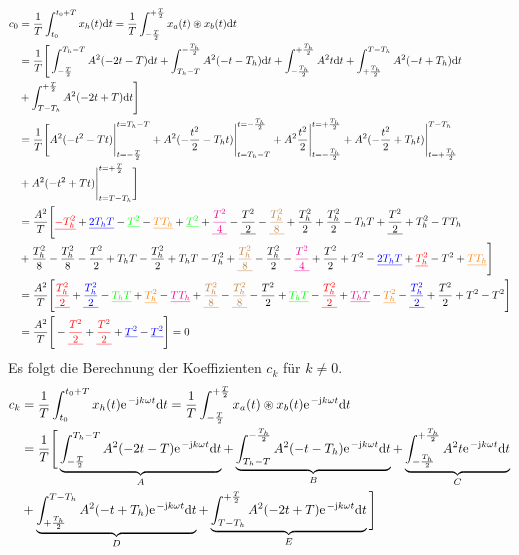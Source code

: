 \documentclass[11pt,a4paper,DIV=12]{scrartcl}
\newcommand{\ured}[1]{\textcolor{red}{\underline{#1}}}
\newcommand{\ublue}[1]{\textcolor{blue}{\underline{#1}}}
\newcommand{\ugreen}[1]{\textcolor{green}{\underline{#1}}}
\newcommand{\uorange}[1]{\textcolor{orange}{\underline{#1}}}
\newcommand{\umagenta}[1]{\textcolor{magenta}{\underline{#1}}}
\newcommand{\ublack}[1]{\textcolor{black}{\underline{#1}}}
\newcommand{\ubrown}[1]{\textcolor{brown}{\underline{#1}}}
\newcommand{\diff}{\mathrm{d}}
\begin{document}
\begin{align}
	c_0&=\frac{1}{T}\int_{t_0}^{t_0+T}x_{h}(t)\diff t=\frac{1}{T}\int_{-\frac{T}{2}}^{+\frac{T}{2}}x_{a}(t)\circledast x_{b}(t)\diff t \nonumber \\
	&=\frac{1}{T}\Bigg [\int_{-\frac{T}{2}}^{T_h-T}A^2(-2t-T)\diff t+\int_{T_h-T}^{-\frac{T_h}{2}}A^2(-t-T_h)\diff t+\int_{-\frac{T_h}{2}}^{+\frac{T_h}{2}}A^2t\diff t+\int_{+\frac{T_h}{2}}^{T-T_h}A^2(-t+T_h)\diff t\nonumber \\
	&+\int_{T-T_h}^{+\frac{T}{2}}A^2(-2t+T)\diff t\Bigg ]\nonumber \\
	&=\frac{1}{T}\Bigg [A^2(-t^2-Tt)\Bigg |_{t=-\frac{T}{2}}^{t=T_h-T}+A^2(-\frac{t^2}{2}-T_ht)\Bigg |_{t=T_h-T}^{t=-\frac{T_h}{2}}+A^2\frac{t^2}{2}\Bigg |_{t=-\frac{T_h}{2}}^{t=+\frac{T_h}{2}}+A^2(-\frac{t^2}{2}+T_ht)\Bigg |_{t=+\frac{T_h}{2}}^{T-T_h}\nonumber \\
	&+A^2(-t^2+Tt)\Bigg |_{t=T-T_h}^{t=+\frac{T}{2}}\Bigg ] \nonumber \\
	&=\frac{A^2}{T}\Bigg [\ured{-T_h^2}+\ublue{2T_hT}-\ugreen{T^2}-\uorange{TT_h}+\ugreen{T^2}+\umagenta{\frac{T^2}{4}}-\ublack{\frac{T^2}{2}}-\ubrown{\frac{T_h^2}{8}}+\frac{T_h^2}{2}+\frac{T_h^2}{2}-T_hT+\ublack{\frac{T^2}{2}}+T_h^2-TT_h\nonumber \\
	&+\frac{T_h^2}{8}-\frac{T_h^2}{8}-\frac{T^2}{2}+T_hT-\frac{T_h^2}{2}+T_hT-T_h^2+\ubrown{\frac{T_h^2}{8}}-\frac{T_h^2}{2}-\umagenta{\frac{T^2}{4}}+\frac{T^2}{2}+T^2-\ublue{2T_hT}+\ured{T_h^2}-T^2+\uorange{TT_h}\Bigg ]\nonumber \\
	&=\frac{A^2}{T}\Bigg [\ured{\frac{T_h^2}{2}}+\ublue{\frac{T_h^2}{2}}-\ugreen{T_hT}+\uorange{T_h^2}-\umagenta{TT_h}+\ubrown{\frac{T_h^2}{8}}-\ubrown{\frac{T_h^2}{8}}-\frac{T^2}{2}+\ugreen{T_hT}-\ured{\frac{T_h^2}{2}}+\umagenta{T_hT}-\uorange{T_h^2}-\ublue{\frac{T_h^2}{2}}+\frac{T^2}{2}+T^2-T^2\Bigg ] \nonumber \\
	&=\frac{A^2}{T}\Bigg [-\ured{\frac{T^2}{2}}+\ured{\frac{T^2}{2}}+\ublue{T^2}-\ublue{T^2}\Bigg] = 0
\end{align}
Es folgt die Berechnung der Koeffizienten $c_k$ für $k\neq 0$.
\begin{align}
	c_k&=\frac{1}{T}\int_{t_0}^{t_0+T}x_{h}(t)\e^{-\im k \omega t}\diff t=\frac{1}{T}\int_{-\frac{T}{2}}^{+\frac{T}{2}}x_{a}(t)\circledast x_{b}(t)\e^{-\im k \omega t}\diff t\nonumber \\
	&=\frac{1}{T}\Bigg [\underbrace{\int_{-\frac{T}{2}}^{T_h-T}A^2(-2t-T)\e^{-\im k \omega t}\diff t}_A+\underbrace{\int_{T_h-T}^{-\frac{T_h}{2}}A^2(-t-T_h)\e^{-\im k \omega t}\diff t}_B+\underbrace{\int_{-\frac{T_h}{2}}^{+\frac{T_h}{2}}A^2t\e^{-\im k \omega t}\diff t}_C\nonumber \\
	&+\underbrace{\int_{+\frac{T_h}{2}}^{T-T_h}A^2(-t+T_h)\e^{-\im k \omega t}\diff t}_D +\underbrace{\int_{T-T_h}^{+\frac{T}{2}}A^2(-2t+T)\e^{-\im k \omega t}\diff t}_E\Bigg ]
\end{align}
\end{document}
